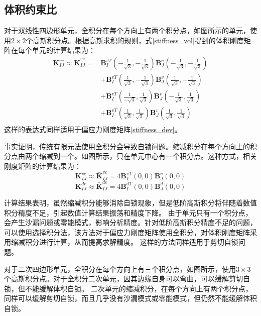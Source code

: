 \subsection{体积约束比}
对于双线性四边形单元，全积分在每个方向上有两个积分点，如图所示的单元，使用$2\times2$个高斯积分点。根据高斯求积的规则，式\eqref{stiffness_vol}提到的体积刚度矩阵在每个单元的计算结果为：
\begin{equation}
    \begin{split}
        \boldsymbol K^{ve}_{IJ} \approx \bar{\boldsymbol K}^{ve}_{IJ} = & \boldsymbol B^{vT}_I(-\frac{1}{\sqrt{3}},-\frac{1}{\sqrt{3}}) \boldsymbol B_J^v(-\frac{1}{\sqrt{3}},-\frac{1}{\sqrt{3}}) \\
        & + \boldsymbol B^{vT}_I(\frac{1}{\sqrt{3}},-\frac{1}{\sqrt{3}}) \boldsymbol B_J^v(\frac{1}{\sqrt{3}},-\frac{1}{\sqrt{3}})\\
        & + \boldsymbol B^{vT}_I(\frac{1}{-\sqrt{3}},\frac{1}{\sqrt{3}}) \boldsymbol B_J^v(-\frac{1}{\sqrt{3}},\frac{1}{\sqrt{3}})\\
        & + \boldsymbol B^{vT}_I(\frac{1}{\sqrt{3}},\frac{1}{\sqrt{3}}) \boldsymbol B_J^v(\frac{1}{\sqrt{3}},\frac{1}{\sqrt{3}})\\
    \end{split}
\end{equation}
这样的表达式同样适用于偏应力刚度矩阵\eqref{stiffness_dev}。

事实证明，传统有限元法使用全积分会导致自锁问题。缩减积分在每个方向上的积分点由两个缩减到一个。如图所示，只在单元中心有一个积分点。这种方式，相关刚度矩阵的计算结果为：
\begin{equation}
        \boldsymbol K^{ve}_{IJ} \approx \bar{\boldsymbol K}^{ve}_{IJ} = 4\boldsymbol B^{vT}_I(0,0) \boldsymbol B_J^v(0,0)
\end{equation}
\begin{equation}
    \boldsymbol K^{de}_{IJ} \approx \bar{\boldsymbol K}^{de}_{IJ} = 4\boldsymbol B^{dT}_I(0,0) \boldsymbol B_J^d(0,0)
\end{equation}

计算结果表明，虽然缩减积分能够消除自锁现象，但是低阶高斯积分将伴随着数值积分精度不足，引起数值计算结果振荡和精度下降。
由于单元只有一个积分点，会产生沙漏问题或零能模式，影响分析精度。针对低阶高斯积分精度不足的问题，可以使用选择积分法，该方法对于偏应力刚度矩阵使用全积分，对体积刚度矩阵采用缩减积分进行计算，从而提高求解精度。
这样的方法同样适用于剪切自锁问题。

对于二次四边形单元，全积分在每个方向上有三个积分点，如图所示，使用$3\times3$个高斯积分点。对于全积分二次单元，因其边缘自身可以弯曲，可以缓解剪切自锁，但不能缓解体积自锁。
二次单元的缩减积分，在每个方向上有两个积分点，同样可以缓解剪切自锁，而且几乎没有沙漏模式或零能模式，但仍然不能缓解体积自锁。

